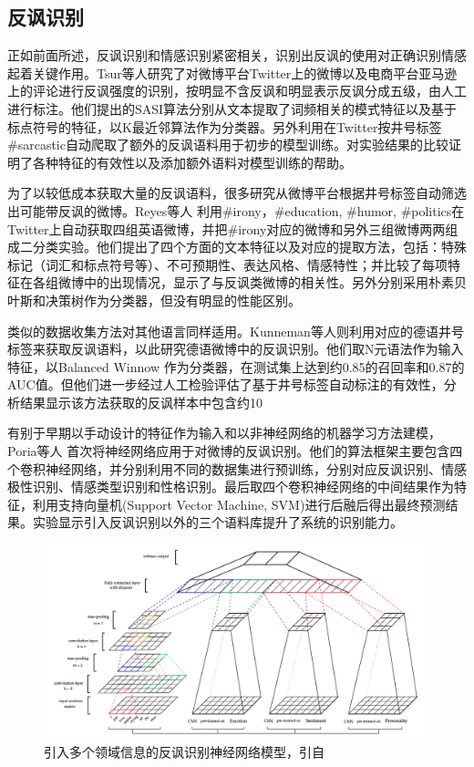 \subsection{反讽识别}

正如前面所述，反讽识别和情感识别紧密相关，识别出反讽的使用对正确识别情感起着关键作用。Tsur等人\cite{tsur2010icwsm}\cite{davidov2010semi}研究了对微博平台Twitter上的微博以及电商平台亚马逊上的评论进行反讽强度的识别，按明显不含反讽和明显表示反讽分成五级，由人工进行标注。他们提出的SASI算法分别从文本提取了词频相关的模式特征以及基于标点符号的特征，以K最近邻算法作为分类器。另外利用在Twitter按井号标签\#sarcastic自动爬取了额外的反讽语料用于初步的模型训练。对实验结果的比较证明了各种特征的有效性以及添加额外语料对模型训练的帮助。

为了以较低成本获取大量的反讽语料，很多研究从微博平台根据井号标签自动筛选出可能带反讽的微博。Reyes等人 \cite{reyes2013multidimensional} 利用\#irony，\#education, \#humor, \#politics在Twitter上自动获取四组英语微博，并把\#irony对应的微博和另外三组微博两两组成二分类实验。他们提出了四个方面的文本特征以及对应的提取方法，包括：特殊标记（词汇和标点符号等）、不可预期性、表达风格、情感特性；并比较了每项特征在各组微博中的出现情况，显示了与反讽类微博的相关性。另外分别采用朴素贝叶斯和决策树作为分类器，但没有明显的性能区别。

类似的数据收集方法对其他语言同样适用。Kunneman等人\cite{kunneman2015signaling}则利用对应的德语井号标签来获取反讽语料，以此研究德语微博中的反讽识别。他们取N元语法作为输入特征，以Balanced Winnow \cite{littlestone1988learning}作为分类器，在测试集上达到约0.85的召回率和0.87的AUC值。但他们进一步经过人工检验评估了基于井号标签自动标注的有效性，分析结果显示该方法获取的反讽样本中包含约10%

有别于早期以手动设计的特征作为输入和以非神经网络的机器学习方法建模，Poria等人 \cite{poria2016deeper} 首次将神经网络应用于对微博的反讽识别。他们的算法框架主要包含四个卷积神经网络，并分别利用不同的数据集进行预训练，分别对应反讽识别、情感极性识别、情感类型识别和性格识别。最后取四个卷积神经网络的中间结果作为特征，利用支持向量机(Support Vector Machine, SVM)进行后融后得出最终预测结果。实验显示引入反讽识别以外的三个语料库提升了系统的识别能力。

\begin{figure}[H] %
  \centering
  \includegraphics[width=\textwidth]{img/poria2016deeper.png}
  \caption{引入多个领域信息的反讽识别神经网络模型，引自\cite{poria2016deeper}}
  \label{fig:poria2016deeper}
\end{figure}

